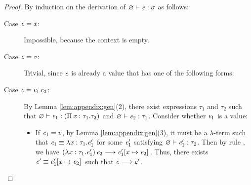\begin{proof}
    By induction on the derivation of $\varnothing  \vdash  \mathit{e}  :  \sigma$ as follows:
    \begin{description}
        \item[Case $\mathit{e}  =  \mathit{x}$:] Impossible, because the context is empty.
        \item[Case $\mathit{e}  =  \mathit{v}$:] Trivial, since $\mathit{e}$ is already a value that
has one of the following forms:
		\begin{inparaenum}[(1)]
		    \item $\star$,
			\item $\lambda  \ottmv{x}  \ottsym{:}  \tau  \ottsym{.}  \ottnt{e}$,
			\item $\Pi \, \ottmv{x}  \ottsym{:}  \tau_{{\mathrm{1}}}  \ottsym{.}  \tau_{{\mathrm{2}}}$,
			\item $\mathsf{cast}^{\uparrow} \, \ottsym{[}  \tau  \ottsym{]} \,  \ottnt{e}$.
		\end{inparaenum}
		\item[Case $\mathit{e}=\mathit{e_{{\mathrm{1}}}} \, \mathit{e_{{\mathrm{2}}}}$:] By Lemma \ref{lem:appendix:gen}(2), there
exist expressions $\tau_{{\mathrm{1}}}$ and $\tau_{{\mathrm{2}}}$ such that $\varnothing  \vdash  \mathit{e_{{\mathrm{1}}}}  :  (  \Pi \, \mathit{x}  :  \tau_{{\mathrm{1}}}  .  \tau_{{\mathrm{2}}}  )$ and
$\varnothing  \vdash  \mathit{e_{{\mathrm{2}}}}  :  \tau_{{\mathrm{1}}}$. Consider whether $\mathit{e_{{\mathrm{1}}}}$ is a value:
    		\begin{itemize}
    		    \item If $\mathit{e_{{\mathrm{1}}}}=v$, by Lemma \ref{lem:appendix:gen}(3), it must be a
$\lambda$-term such that $\mathit{e_{{\mathrm{1}}}}  \equiv  \lambda  \mathit{x}  :  \tau_{{\mathrm{1}}}  .  \mathit{e'_{{\mathrm{1}}}}$ for some $\mathit{e'_{{\mathrm{1}}}}$ satisfying
$\varnothing  \vdash  \mathit{e'_{{\mathrm{1}}}}  :  \tau_{{\mathrm{2}}}$. Then by rule , we have $(  \lambda  \mathit{x}  :  \tau_{{\mathrm{1}}}  .  \mathit{e'_{{\mathrm{1}}}}  ) \, \mathit{e_{{\mathrm{2}}}}  \longrightarrow  \mathit{e'_{{\mathrm{1}}}}  [  \mathit{x}  \mapsto  \mathit{e_{{\mathrm{2}}}}  ] \,$. Thus, there exists $\mathit{e'}  \equiv  \mathit{e'_{{\mathrm{1}}}}  [  \mathit{x}  \mapsto  \mathit{e_{{\mathrm{2}}}}  ] \,$ such that
$\mathit{e}  \longrightarrow  \mathit{e'}$.

\end{itemize}
\end{description}
\end{proof}

